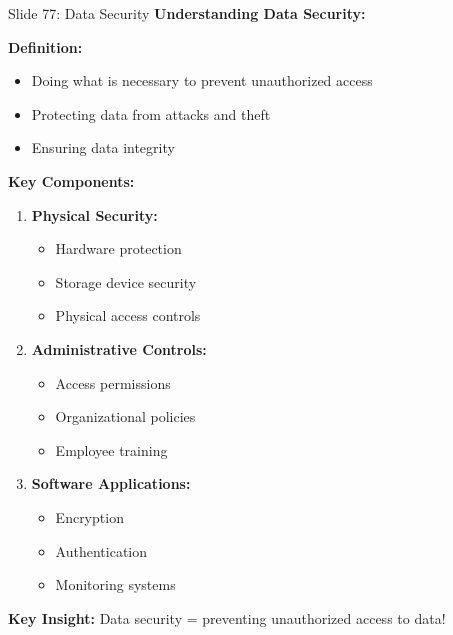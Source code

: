 \documentclass[8pt]{beamer}
\begin{document}
	\begin{frame}{Slide 77: Data Security}
		\fontsize{6.5}{7.5}\selectfont
		\textbf{Understanding Data Security:}
		
		\vspace{0.1cm}
		\textbf{Definition:}
		\begin{itemize}
			\item Doing what is necessary to prevent unauthorized access
			\item Protecting data from attacks and theft
			\item Ensuring data integrity
		\end{itemize}
		
		\vspace{0.1cm}
		\textbf{Key Components:}
		\begin{enumerate}
			\item \textbf{Physical Security:}
			\begin{itemize}
				\item Hardware protection
				\item Storage device security
				\item Physical access controls
			\end{itemize}
			\item \textbf{Administrative Controls:}
			\begin{itemize}
				\item Access permissions
				\item Organizational policies
				\item Employee training
			\end{itemize}
			\item \textbf{Software Applications:}
			\begin{itemize}
				\item Encryption
				\item Authentication
				\item Monitoring systems
			\end{itemize}
		\end{enumerate}
		
		\textcolor{myblue}{\textbf{Key Insight:}} Data security = \textcolor{myblue}{preventing unauthorized access} to data!
	\end{frame}
	
\end{document}
